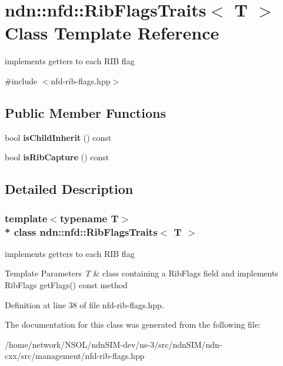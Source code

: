 \hypertarget{classndn_1_1nfd_1_1RibFlagsTraits}{}\section{ndn\+:\+:nfd\+:\+:Rib\+Flags\+Traits$<$ T $>$ Class Template Reference}
\label{classndn_1_1nfd_1_1RibFlagsTraits}


implements getters to each R\+IB flag  




{\ttfamily \#include $<$nfd-\/rib-\/flags.\+hpp$>$}

\subsection*{Public Member Functions}
\begin{DoxyCompactItemize}
\item 
bool {\bfseries is\+Child\+Inherit} () const\hypertarget{classndn_1_1nfd_1_1RibFlagsTraits_adb5aae9872a61b0a91a1a7f7c8a35978}{}\label{classndn_1_1nfd_1_1RibFlagsTraits_adb5aae9872a61b0a91a1a7f7c8a35978}

\item 
bool {\bfseries is\+Rib\+Capture} () const\hypertarget{classndn_1_1nfd_1_1RibFlagsTraits_a7c6df9f4c6cc929afcd279caaafb060c}{}\label{classndn_1_1nfd_1_1RibFlagsTraits_a7c6df9f4c6cc929afcd279caaafb060c}

\end{DoxyCompactItemize}


\subsection{Detailed Description}
\subsubsection*{template$<$typename T$>$\\*
class ndn\+::nfd\+::\+Rib\+Flags\+Traits$<$ T $>$}

implements getters to each R\+IB flag 


\begin{DoxyTemplParams}{Template Parameters}
{\em T} & class containing a Rib\+Flags field and implements {\ttfamily Rib\+Flags get\+Flags() const} method \\
\hline
\end{DoxyTemplParams}


Definition at line 38 of file nfd-\/rib-\/flags.\+hpp.



The documentation for this class was generated from the following file\+:\begin{DoxyCompactItemize}
\item 
/home/network/\+N\+S\+O\+L/ndn\+S\+I\+M-\/dev/ns-\/3/src/ndn\+S\+I\+M/ndn-\/cxx/src/management/nfd-\/rib-\/flags.\+hpp\end{DoxyCompactItemize}
